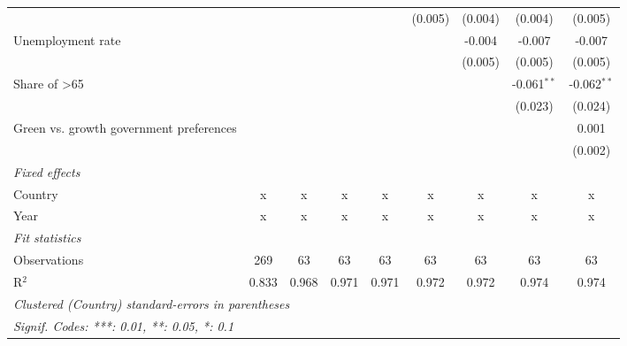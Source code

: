 \begin{table}[htbp]
\begin{tabular}{lcccccccc}
                                                                         &         &         &             &             & (0.005)     & (0.004) & (0.004)       & (0.005)\\   
      Unemployment rate                                                  &         &         &             &             &             & -0.004  & -0.007        & -0.007\\   
                                                                         &         &         &             &             &             & (0.005) & (0.005)       & (0.005)\\   
      Share of >65                                                       &         &         &             &             &             &         & -0.061$^{**}$ & -0.062$^{**}$\\   
                                                                         &         &         &             &             &             &         & (0.023)       & (0.024)\\   
      Green vs. growth government preferences                            &         &         &             &             &             &         &               & 0.001\\   
                                                                         &         &         &             &             &             &         &               & (0.002)\\   
      \emph{Fixed effects}\\
      Country                                                            & x       & x       & x           & x           & x           & x       & x             & x\\  
      Year                                                               & x       & x       & x           & x           & x           & x       & x             & x\\  
      \midrule \emph{Fit statistics}\\
      Observations                                                       & 269     & 63      & 63          & 63          & 63          & 63      & 63            & 63\\  
      R$^2$                                                              & 0.833   & 0.968   & 0.971       & 0.971       & 0.972       & 0.972   & 0.974         & 0.974\\  
      \midrule
      \multicolumn{9}{l}{\emph{Clustered (Country) standard-errors in parentheses}}\\
      \multicolumn{9}{l}{\emph{Signif. Codes: ***: 0.01, **: 0.05, *: 0.1}}\\
   \end{tabular}
\end{table}



